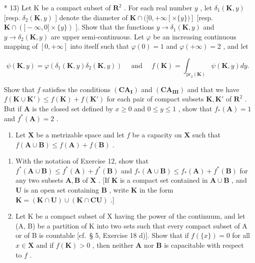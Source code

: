 * 13) Let K be a compact subset of \(\mathbf{R}^2\) . For each real number \(y\) , let \(\delta_1(\mathbf{K}, y)\) {[}resp. \(\delta_2(\mathbf{K}, y)\) {]} denote the diameter of \(\mathbf{K} \cap ([0, +\infty [\times \{y\})]\) {[}resp. \(\mathbf{K} \cap (]-\infty, 0] \times \{y\})\) {]}. Show that the functions \(y \to \delta_1(\mathbf{K}, y)\) and \(y \to \delta_2(\mathbf{K}, y)\) are upper semi-continuous. Let \(\varphi\) be an increasing continuous mapping of \([0, +\infty]\) into itself such that \(\varphi(0) = 1\) and \(\varphi(+\infty) = 2\) , and let

\[
\psi (\mathbf {K}, y) = \varphi (\delta_ {1} (\mathbf {K}, y) \delta_ {2} (\mathbf {K}, y)) \quad \text { and } \quad f (\mathbf {K}) = \int_ {\mathrm{pr} _ {2} (\mathbf {K})} \psi (\mathbf {K}, y) d y.
\]

Show that \(f\) satisfies the conditions \((\mathbf{CA}_{\mathbf{I}})\) and \((\mathbf{CA}_{\mathbf{III}})\) and that we have \(f(\mathbf{K} \cup \mathbf{K}') \leqslant f(\mathbf{K}) + f(\mathbf{K}')\) for each pair of compact subsets \(\mathbf{K}, \mathbf{K}'\) of \(\mathbf{R}^2\) . But if \(\mathbf{A}\) is the closed set defined by \(x \geqslant 0\) and \(0 \leqslant y \leqslant 1\) , show that \(f_*(\mathbf{A}) = 1\) and \(f^*(\mathbf{A}) = 2\) .

\begin{enumerate}
\def\labelenumi{\arabic{enumi})}
\setcounter{enumi}{13}
\tightlist
\item
  Let \(\mathbf{X}\) be a metrizable space and let \(f\) be a capacity on \(\mathbf{X}\) such that \(f(\mathbf{A} \cup \mathbf{B}) \leqslant f(\mathbf{A}) + f(\mathbf{B})\) .
\end{enumerate}

\begin{enumerate}
\def\labelenumi{\alph{enumi})}
\item
  With the notation of Exercise 12, show that \(f^{*}(\mathbf{A} \cup \mathbf{B}) \leqslant f^{*}(\mathbf{A}) + f^{*}(\mathbf{B})\) and \(f_{*}(\mathbf{A} \cup \mathbf{B}) \leqslant f_{*}(\mathbf{A}) + f^{*}(\mathbf{B})\) for any two subsets \(\mathbf{A}, \mathbf{B}\) of \(\mathbf{X}\) . {[}If \(\mathbf{K}\) is a compact set contained in \(\mathbf{A} \cup \mathbf{B}\) , and \(\mathbf{U}\) is an open set containing \(\mathbf{B}\) , write \(\mathbf{K}\) in the form \(\mathbf{K} = (\mathbf{K} \cap \mathbf{U}) \cup (\mathbf{K} \cap \mathbf{C}\mathbf{U})\) .{]}
\item
  Let K be a compact subset of X having the power of the continuum, and let (A, B) be a partition of K into two sets such that every compact subset of A or of B is countable {[}cf.~§ 5, Exercise 18 d){]}. Show that if \(f(\{x\}) = 0\) for all \(x \in \mathbf{X}\) and if \(f(\mathbf{K}) > 0\) , then neither \(\mathbf{A}\) nor \(\mathbf{B}\) is capacitable with respect to \(f\) .
\end{enumerate}

